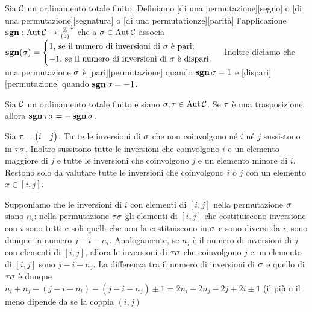 \begin{Definition}
	Sia $\mathcal{C}$ un ordinamento totale finito.
	Definiamo [di una permutazione][segno] o
	[di una permutazione][segnatura] o
	[di una permutationze][parit\`a]
	l'applicazione $\operatorname{\operatorname{\textbf{sgn}}}: \operatorname{Aut}{\mathcal{C}} \rightarrow
	\frac{\mathbb{Z}}{\left ( 3 \right )}^*$ che a
	$\Permutation \in \Automorphisms{\Class}$
	associa $\PermutationSign(\Permutation) =
	\begin{cases}
		1\text{, se il numero di inversioni di }\Permutation\text{ \`e pari};\\
		-1\text{, se il numero di inversioni di }\Permutation\text{ \`e dispari}.
	\end{cases}$
	Inoltre diciamo che una permutazione $\Permutation$ \`e
	[pari][permutazione]
	quando $\PermutationSign{\Permutation} = 1$ e
	[dispari][permutazione]
	quando $\PermutationSign{\Permutation} = -1$.
\end{Definition}
\begin{Theorem}
	Sia $\mathcal{C}$ un ordinamento totale finito
	e siano $\Permutation, \Transposition \in \Automorphisms{\Class}$.
	Se $\tau$ \`e una trasposizione, allora
	$\PermutationSign{\Transposition\Permutation} =
	- \PermutationSign{\Permutation}$.
\end{Theorem}
\Proof
Sia $\tau = \left ( \begin{matrix} i & j \end{matrix} \right )$.
Tutte le inversioni di $\Permutation$ che non coinvolgono n\'e $i$ n\'e $j$
sussistono in $\Transposition\Permutation$.
Inoltre sussitono tutte le inversioni che coinvolgono $i$ e un elemento maggiore di $j$
e tutte le inversioni che coinvolgono $j$ e un elemento minore di $i$.
Restono solo da valutare tutte le inversioni che coinvolgono $i$ o $j$ con un elemento
$x \in [i,j]$.
\par
Supponiamo che le inversioni di $i$ con elementi di $[i,j]$ nella permutazione
$\Permutation$ siano $n_i$: nella permutazione $\Transposition\Permutation$
gli elementi di $[i,j]$ che costituiscono inversione con $i$ sono tutti e soli quelli
che non la costituiscono in $\Permutation$ e sono diversi da $i$; sono dunque in numero
$j - i - n_i$.
Analogamente, se $n_j$ \`e il numero di inversioni di $j$ con elementi di $[i,j]$,
allora le inversioni di $\Transposition\Permutation$ che coinvolgono $j$ e un elemento
di $[i,j]$ sono $j - i - n_j$.
La differenza tra il numero di inversioni di $\Permutation$ e quello di $\Transposition\Permutation$
\`e dunque $n_i + n_j - (j - i - n_i) - (j - i - n_j) \pm 1 =
2n_i + 2n_j - 2j + 2i \pm 1$ (il pi\`u o il meno dipende da se la coppia $(i,j)$
